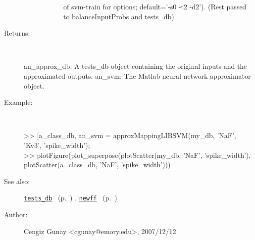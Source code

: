 \begin{description}
\begin{description}
\begin{description}
of svm-train for options; default='-s0 -t2 -d2').
(Rest passed to balanceInputProbs and tests\_db)
\end{description}%
\end{description}%
%
\item[Returns:
]~

	an\_approx\_db: A tests\_db object containing the original inputs and
			the approximated outputs.
	an\_svm: The Matlab neural network approximator object.
%
\item[Example:]~
\begin{lyxcode} >> [a\_class\_db, an\_svm = approxMappingLIBSVM(my\_db, {'NaF', 'Kv3'}, {'spike\_width'});
\\%
 >> plotFigure(plot\_superpose({plotScatter(my\_db, 'NaF', 'spike\_width'),
\\%
                                plotScatter(a\_class\_db, 'NaF', 'spike\_width')}))
\\%
\end{lyxcode}
%
\item[See also:]%
\hyperlink{ref_tests_db}{\texttt{tests\_db}}%
\ (p.~\pageref{ref_tests_db})%
%
, \hyperlink{ref_newff}{\texttt{newff}}%
\ (p.~\pageref{ref_newff})%
%
%
\item[Author:]%
Cengiz Gunay <cgunay@emory.edu>, 2007/12/12
%
\end{description}
\methodline%
